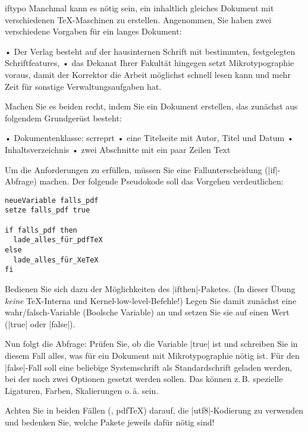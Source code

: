 \documentclass[
	draft,
	blatt=11,
	ausgabe=25.\,06.\,2010,
	rückgabe=02.\,07.\,2010
]{lcourse-hd}
\begin{document}
\begin{exercise}[
  name=Typographie auf Anfrage,
  punkte=5,
  abgabe = Quelltext per Mail{,} das fertige Dokument als Ausdruck.
]{iftypo}
Manchmal kann es nötig sein, ein inhaltlich gleiches Dokument mit verschiedenen \TeX-Maschinen zu erstellen. Angenommen, Sie haben zwei verschiedene Vorgaben für ein langes Dokument:

• Der Verlag besteht auf der hausinternen Schrift mit bestimmten, festgelegten Schriftfeatures,
• das Dekanat Ihrer Fakultät hingegen setzt Mikrotypographie voraus, damit der Korrektor die Arbeit möglichst schnell lesen kann und mehr Zeit für sonstige Verwaltungsaufgaben hat.

Machen Sie es beiden recht, indem Sie ein Dokument erstellen, das zunächst aus folgendem Grundgerüst besteht:

• Dokumentenklasse: scrreprt
• eine Titelseite mit Autor, Titel und Datum
• Inhaltsverzeichnis
• zwei Abschnitte mit ein paar Zeilen Text

Um die Anforderungen zu erfüllen, müssen Sie eine Fallunterscheidung (|if|-Abfrage) machen. Der folgende Pseudokode soll das Vorgehen verdeutlichen:
\begin{verbatim}
neueVariable falls_pdf
setze falls_pdf true

if falls_pdf then
  lade_alles_für_pdfTeX
else
  lade_alles_für_XeTeX
fi
\end{verbatim}

Bedienen Sie sich dazu der Möglichkeiten des |ifthen|-Paketes. (In dieser Übung \emph{keine} \TeX-Interna und Kernel-low-level-Befehle!) Legen Sie damit zunächst eine wahr/falsch-Variable (Boolsche Variable) an und setzen Sie sie auf einen Wert (|true| oder |false|).

Nun folgt die Abfrage: Prüfen Sie, ob die Variable |true| ist und schreiben Sie in diesem Fall alles, was für ein Dokument mit Mikrotypographie nötig ist. Für den |false|-Fall soll eine beliebige Systemschrift als Standardschrift geladen werden, bei der noch zwei Optionen gesetzt werden sollen. Das können z.\,B. spezielle Ligaturen, Farben, Skalierungen o.\,ä. sein.

Achten Sie in beiden Fällen (\XeTeX, pdf\TeX) darauf, die |utf8|-Kodierung zu verwenden und bedenken Sie, welche Pakete jeweils dafür nötig sind!
\end{exercise}
\end{document}
